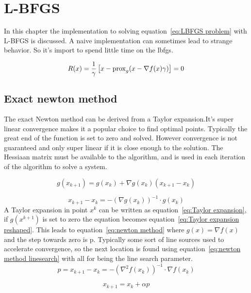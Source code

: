 \chapter{L-BFGS}
	In this chapter the implementation to solving equation~\ref{eq:LBFGS problem} with L-BFGS is discussed. A naive implementation can sometimes lead to strange behavior. So it's import to spend little time on the lbfgs.
	
	
	\begin{equation}
	R(x) = \frac{1}{\gamma}\left[ x - \operatorname{prox}_g( x - \nabla f(x)\gamma) \right] = 0
	\label{eq:LBFGS problem}
	\end{equation}
	
	\section{Exact newton method}
	The exact Newton method can be derived from a Taylor expansion.It's super linear convergence makes it a popular choice to find optimal points. Typically the great end of the function is set to zero and solved. However convergence is not guaranteed and only super linear if it is close enough to the solution. The Hessiaan matrix must be available to the algorithm, and is used in each iteration of the algorithm to solve a system.
	
		\begin{equation}
			g(x_{k+1}) = g(x_k) + \nabla g(x_k)(x_{k+1}-x_k)
			\label{eq:Taylor expansion}
		\end{equation}
		
		\begin{equation}
			x_{k+1}-x_k = -(\nabla g(x_k))^{-1} \cdot g(x_k)
			\label{eq:Taylor expansion reshaped}
		\end{equation}
	A Taylor expansion in point $x^k$ can be written as equation~\ref{eq:Taylor expansion}, if $g(x^{k+1})$ is set to zero the equation becomes equation~\ref{eq:Taylor expansion reshaped}. This leads to equation~\ref{eq:newton method} where $g(x)=\nabla f(x)$ and the step towards zero is p. Typically some sort of line sources used to accelerate convergence, so the next location is found using equation~\ref{eq:newton method linesearch} with all for being the line search parameter.	
		\begin{equation}
			p = x_{k+1}-x_k = -(\nabla^2 f(x_k))^{-1} \cdot \nabla f(x_k)
			\label{eq:newton method}	
		\end{equation}
	
		\begin{equation}
		 	x_{k+1} = x_k + \alpha p
		 	\label{eq:newton method linesearch}
		\end{equation}
		
